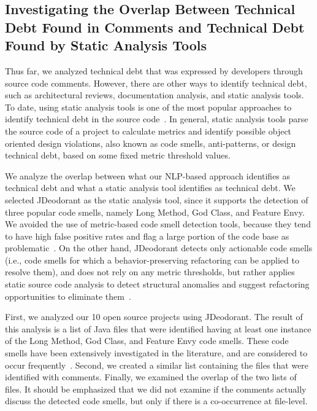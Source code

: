 \subsection{Investigating the Overlap Between Technical Debt Found in Comments and Technical Debt Found by Static Analysis Tools}
\label{sec:overlap_with_static_analysis_tools}
Thus far, we analyzed technical debt that was expressed by developers through source code comments. However, there are other ways to identify technical debt, such as architectural reviews, documentation analysis, and static analysis tools. To date, using static analysis tools is one of the most popular approaches to identify technical debt in the source code~\cite{Fontana2012MTD}. In general, static analysis tools parse the source code of a project to calculate metrics and identify possible object oriented design violations, also known as code smells, anti-patterns, or design technical debt, based on some fixed metric threshold values. 

We analyze the overlap between what our NLP-based approach identifies as technical debt and what a static analysis tool identifies as technical debt. We selected JDeodorant as the static analysis tool, since it supports the detection of three popular code smells, namely Long Method, God Class, and Feature Envy. We avoided the use of metric-based code smell detection tools, because they tend to have high false positive rates and flag a large portion of the code base as problematic~\cite{Fontana2016SANER}. On the other hand, JDeodorant detects only actionable code smells (i.e., code smells for which a behavior-preserving refactoring can be applied to resolve them), and does not rely on any metric thresholds, but rather applies static source code analysis to detect structural anomalies and suggest refactoring opportunities to eliminate them~\cite{Tsantalis2008CSMR}.

First, we analyzed our 10 open source projects using JDeodorant. The result of this analysis is a list of Java files that were identified having at least one instance of
the Long Method, God Class, and Feature Envy code smells. These code smells have been extensively investigated in the literature, and are considered to occur frequently~\cite{Olbrich2010ICSM,Sjoberg2013TSE}. Second, we created a similar list containing the files that were identified with \SATD comments. Finally, we examined the overlap of the two lists of files. It should be emphasized that we did not examine if the \SATD comments actually discuss the detected code smells, but only if there is a co-occurrence at file-level.

